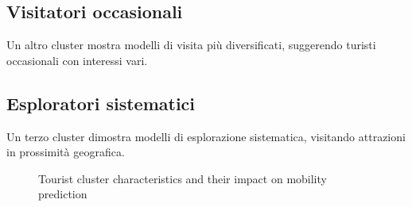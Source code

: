 \subsection{Visitatori occasionali}
Un altro cluster mostra modelli di visita più diversificati, suggerendo turisti occasionali con interessi vari.

\subsection{Esploratori sistematici}
Un terzo cluster dimostra modelli di esplorazione sistematica, visitando attrazioni in prossimità geografica.

\begin{figure}[H]
\centering
\caption{Tourist cluster characteristics and their impact on mobility prediction}
\label{fig:cluster_analysis}
\end{figure}
